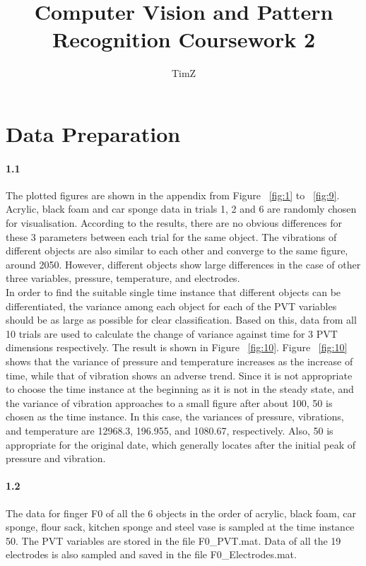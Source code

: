 \documentclass[10pt,twocolumn,letterpaper]{article}
\begin{document}
\title{Computer Vision and Pattern Recognition Coursework 2}
\author{TimZ}
\maketitle




\section{Data Preparation}
\paragraph{1.1}
The plotted figures are shown in the appendix from Figure ~\ref{fig:1} to ~\ref{fig:9}. Acrylic, black foam and car sponge data in trials 1, 2 and 6 are randomly chosen for visualisation. According to the results, there are no obvious differences for these 3 parameters between each trial for the same object. The vibrations of different objects are also similar to each other and converge to the same figure, around 2050. However, different objects show large differences in the case of other three variables, pressure, temperature, and electrodes.\\

\noindent In order to find the suitable single time instance that different objects can be differentiated, the variance among each object for each of the PVT variables should be as large as possible for clear classification. Based on this, data from all 10 trials are used to calculate the change of variance against time for 3 PVT dimensions respectively. The result is shown in Figure ~\ref{fig:10}. Figure ~\ref{fig:10} shows that the variance of pressure and temperature increases as the increase of time, while that of vibration shows an adverse trend. Since it is not appropriate to choose the time instance at the beginning as it is not in the steady state, and the variance of vibration approaches to a small figure after about 100, 50 is chosen as the time instance. In this case, the variances of pressure, vibrations, and temperature are 12968.3, 196.955, and 1080.67, respectively. Also, 50 is appropriate for the original date, which generally locates after the initial peak of pressure and vibration.

\paragraph{1.2}
The data for finger F0 of all the 6 objects in the order of acrylic, black foam, car sponge, flour sack, kitchen sponge and steel vase is sampled at the time instance 50. The PVT variables are stored in the file F0\_PVT.mat. Data of all the 19 electrodes is also sampled and saved in the file F0\_Electrodes.mat. 
\end{document}
